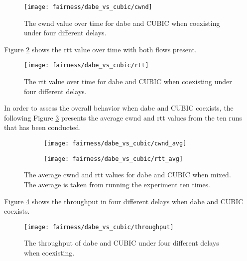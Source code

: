 \begin{figure}[H]
    \centering
    \texttt{[image: fairness/dabe\_vs\_cubic/cwnd]}
    \captionsetup{width=1.0\linewidth}
    \caption{The \gls{cwnd} value over time for \gls{dabe} and CUBIC when coexisting under four different delays.}
    \label{fig:dabe_and_cubic_cwnd}
\end{figure}

Figure \ref{fig:dabe_and_cubic_rtt} shows the \gls{rtt} value over time with both flows present.

\begin{figure}[H]
    \centering
    \texttt{[image: fairness/dabe\_vs\_cubic/rtt]}
    \captionsetup{width=1.0\linewidth}
    \caption{The \gls{rtt} value over time for \gls{dabe} and CUBIC when coexisting under four different delays.}
    \label{fig:dabe_and_cubic_rtt}
\end{figure}

In order to assess the overall behavior when \gls{dabe} and CUBIC coexists, the following Figure \ref{fig:dabe_and_cubic_avg} presents the average \gls{cwnd} and \gls{rtt} values from the ten runs that has been conducted.

\begin{figure}[H]
    \centering
    \begin{subfigure}{0.5\linewidth}
        \centering
        \texttt{[image: fairness/dabe\_vs\_cubic/cwnd\_avg]}
    \end{subfigure}%
    \begin{subfigure}{0.5\linewidth}
        \centering
        \texttt{[image: fairness/dabe\_vs\_cubic/rtt\_avg]}
    \end{subfigure}
    \caption{The average \gls{cwnd} and \gls{rtt} values for \gls{dabe} and CUBIC when mixed. The average is taken from running the experiment ten times.}
    \label{fig:dabe_and_cubic_avg}
\end{figure}

Figure \ref{fig:dabe_and_cubic_throughput} shows the throughput in four different delays when \gls{dabe} and CUBIC coexists.

\begin{figure}[H]
    \centering
    \texttt{[image: fairness/dabe\_vs\_cubic/throughput]}
    \captionsetup{width=1.0\linewidth}
    \caption{The throughput of \gls{dabe} and CUBIC under four different delays when coexisting.}
    \label{fig:dabe_and_cubic_throughput}
\end{figure}






